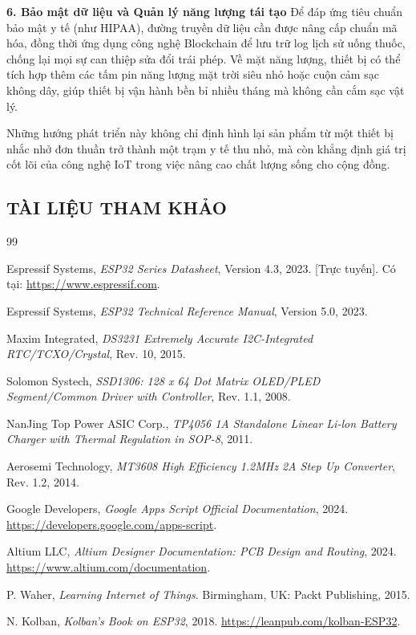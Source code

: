 \documentclass[12pt, a4paper, oneside]{article}
\begin{document}
\textbf{6. Bảo mật dữ liệu và Quản lý năng lượng tái tạo}
Để đáp ứng tiêu chuẩn bảo mật y tế (như HIPAA), đường truyền dữ liệu cần được nâng cấp chuẩn mã hóa, đồng thời ứng dụng công nghệ Blockchain để lưu trữ log lịch sử uống thuốc, chống lại mọi sự can thiệp sửa đổi trái phép. Về mặt năng lượng, thiết bị có thể tích hợp thêm các tấm pin năng lượng mặt trời siêu nhỏ hoặc cuộn cảm sạc không dây, giúp thiết bị vận hành bền bỉ nhiều tháng mà không cần cắm sạc vật lý.

Những hướng phát triển này không chỉ định hình lại sản phẩm từ một thiết bị nhắc nhở đơn thuần trở thành một trạm y tế thu nhỏ, mà còn khẳng định giá trị cốt lõi của công nghệ IoT trong việc nâng cao chất lượng sống cho cộng đồng.

\newpage
\begin{center}
    \section{TÀI LIỆU THAM KHẢO}
\end{center}
\renewcommand{\refname}{}
\renewcommand{\bibname}{}
\begin{thebibliography}{99}


Espressif Systems, \emph{ESP32 Series Datasheet}, Version 4.3, 2023. [Trực tuyến]. Có tại: \url{https://www.espressif.com}.

Espressif Systems, \emph{ESP32 Technical Reference Manual}, Version 5.0, 2023.

Maxim Integrated, \emph{DS3231 Extremely Accurate I2C-Integrated RTC/TCXO/Crystal}, Rev. 10, 2015.

Solomon Systech, \emph{SSD1306: 128 x 64 Dot Matrix OLED/PLED Segment/Common Driver with Controller}, Rev. 1.1, 2008.

NanJing Top Power ASIC Corp., \emph{TP4056 1A Standalone Linear Li-lon Battery Charger with Thermal Regulation in SOP-8}, 2011.

Aerosemi Technology, \emph{MT3608 High Efficiency 1.2MHz 2A Step Up Converter}, Rev. 1.2, 2014.


Google Developers, \emph{Google Apps Script Official Documentation}, 2024. \url{https://developers.google.com/apps-script}.

Altium LLC, \emph{Altium Designer Documentation: PCB Design and Routing}, 2024. \url{https://www.altium.com/documentation}.


P. Waher, \emph{Learning Internet of Things}. Birmingham, UK: Packt Publishing, 2015.

N. Kolban, \emph{Kolban's Book on ESP32}, 2018. \url{https://leanpub.com/kolban-ESP32}.

\end{thebibliography}
\end{document}
